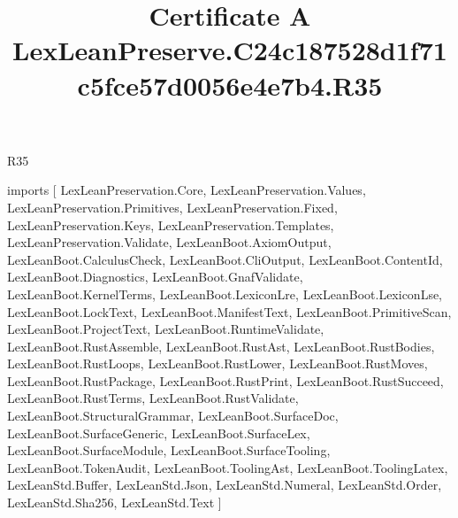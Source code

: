 \begin{lexlean}{R35}
\title{Certificate A LexLeanPreserve.C24c187528d1f71c5fce57d0056e4e7b4.R35}
\begin{coremodule}
imports [
  LexLeanPreservation.Core,
  LexLeanPreservation.Values,
  LexLeanPreservation.Primitives,
  LexLeanPreservation.Fixed,
  LexLeanPreservation.Keys,
  LexLeanPreservation.Templates,
  LexLeanPreservation.Validate,
  LexLeanBoot.AxiomOutput,
  LexLeanBoot.CalculusCheck,
  LexLeanBoot.CliOutput,
  LexLeanBoot.ContentId,
  LexLeanBoot.Diagnostics,
  LexLeanBoot.GnafValidate,
  LexLeanBoot.KernelTerms,
  LexLeanBoot.LexiconLre,
  LexLeanBoot.LexiconLse,
  LexLeanBoot.LockText,
  LexLeanBoot.ManifestText,
  LexLeanBoot.PrimitiveScan,
  LexLeanBoot.ProjectText,
  LexLeanBoot.RuntimeValidate,
  LexLeanBoot.RustAssemble,
  LexLeanBoot.RustAst,
  LexLeanBoot.RustBodies,
  LexLeanBoot.RustLoops,
  LexLeanBoot.RustLower,
  LexLeanBoot.RustMoves,
  LexLeanBoot.RustPackage,
  LexLeanBoot.RustPrint,
  LexLeanBoot.RustSucceed,
  LexLeanBoot.RustTerms,
  LexLeanBoot.RustValidate,
  LexLeanBoot.StructuralGrammar,
  LexLeanBoot.SurfaceDoc,
  LexLeanBoot.SurfaceGeneric,
  LexLeanBoot.SurfaceLex,
  LexLeanBoot.SurfaceModule,
  LexLeanBoot.SurfaceTooling,
  LexLeanBoot.TokenAudit,
  LexLeanBoot.ToolingAst,
  LexLeanBoot.ToolingLatex,
  LexLeanStd.Buffer,
  LexLeanStd.Json,
  LexLeanStd.Numeral,
  LexLeanStd.Order,
  LexLeanStd.Sha256,
  LexLeanStd.Text
]


\end{coremodule}
\end{lexlean}

